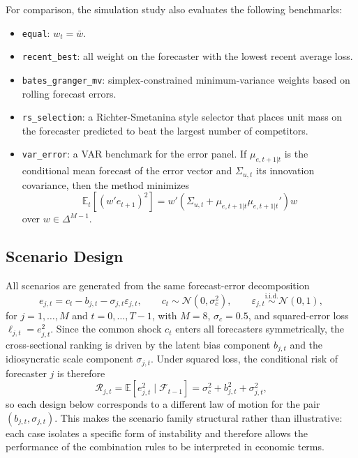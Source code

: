 \documentclass[11pt,a4paper]{article}
\newcommand{\simplex}{\Delta^{M-1}}
\begin{document}
For comparison, the simulation study also evaluates the following benchmarks:
\begin{itemize}
\item \texttt{equal}: $w_t = \bar{w}$.
\item \texttt{recent\_best}: all weight on the forecaster with the lowest recent average loss.
\item \texttt{bates\_granger\_mv}: simplex-constrained minimum-variance weights based on rolling forecast errors.
\item \texttt{rs\_selection}: a Richter-Smetanina style selector that places unit mass on the forecaster predicted to beat the largest number of competitors.
\item \texttt{var\_error}: a VAR benchmark for the error panel. If $\mu_{e,t+1|t}$ is the conditional mean forecast of the error vector and $\Sigma_{u,t}$ its innovation covariance, then the method minimizes
\begin{equation}
\mathbb{E}_{t}\!\left[(w'e_{t+1})^2\right]
=
w'(\Sigma_{u,t}+\mu_{e,t+1|t}\mu_{e,t+1|t}')w
\end{equation}
over $w \in \simplex$.
\end{itemize}

\subsection{Scenario Design}

All scenarios are generated from the same forecast-error decomposition
\begin{equation}
e_{j,t}=c_t-b_{j,t}-\sigma_{j,t}\varepsilon_{j,t},
\qquad
c_t \sim \mathcal{N}(0,\sigma_c^2),
\qquad
\varepsilon_{j,t}\overset{\mathrm{i.i.d.}}{\sim}\mathcal{N}(0,1),
\end{equation}
for $j=1,\dots,M$ and $t=0,\dots,T-1$, with $M=8$, $\sigma_c=0.5$, and squared-error loss $\ell_{j,t}=e_{j,t}^2$. Since the common shock $c_t$ enters all forecasters symmetrically, the cross-sectional ranking is driven by the latent bias component $b_{j,t}$ and the idiosyncratic scale component $\sigma_{j,t}$. Under squared loss, the conditional risk of forecaster $j$ is therefore
\begin{equation}
\mathcal{R}_{j,t}
=
\mathbb{E}\!\left[e_{j,t}^2 \mid \mathcal{F}_{t-1}\right]
=
\sigma_c^2+b_{j,t}^2+\sigma_{j,t}^2,
\end{equation}
so each design below corresponds to a different law of motion for the pair $(b_{j,t},\sigma_{j,t})$. This makes the scenario family structural rather than illustrative: each case isolates a specific form of instability and therefore allows the performance of the combination rules to be interpreted in economic terms.
\end{document}
